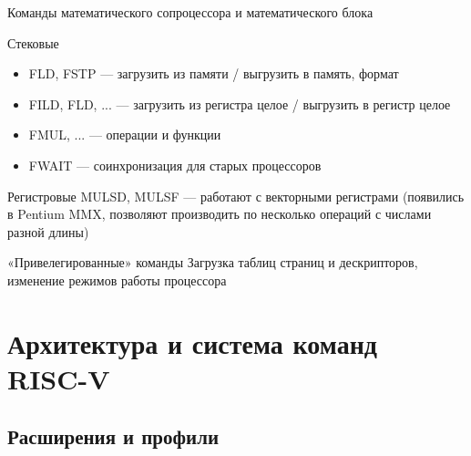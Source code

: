 \documentclass[xetex,aspectratio=43]{beamer}
\begin{document}
\begin{frame}{Команды математического сопроцессора и математического блока}
    \begin{block}{Стековые}
        \begin{itemize}
        \tightlist
        \item
        FLD, FSTP --- загрузить из памяти / выгрузить в память, формат
        \item
        FILD, FLD, ... --- загрузить из регистра целое / выгрузить в регистр целое
        \item
        FMUL, ... --- операции и функции
        \item
        FWAIT --- соинхронизация для старых процессоров
        \end{itemize}
    \end{block}
    \begin{block}{Регистровые}
        MULSD, MULSF --- работают с векторными регистрами (появились в Pentium MMX, позволяют производить по несколько операций с числами разной длины)
    \end{block}
\end{frame}

\begin{frame}{«Привелегированные» команды}
        Загрузка таблиц страниц и дескрипторов, изменение режимов работы
        процессора
\end{frame}


\section{Архитектура и система команд RISC-V}

\subsection{Расширения и профили}
\end{document}
